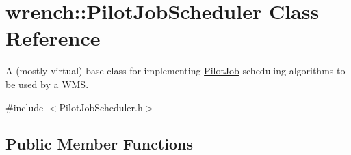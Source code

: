 \hypertarget{classwrench_1_1_pilot_job_scheduler}{}\section{wrench\+:\+:Pilot\+Job\+Scheduler Class Reference}
\label{classwrench_1_1_pilot_job_scheduler}


A (mostly virtual) base class for implementing \hyperlink{classwrench_1_1_pilot_job}{Pilot\+Job} scheduling algorithms to be used by a \hyperlink{classwrench_1_1_w_m_s}{W\+MS}.  




{\ttfamily \#include $<$Pilot\+Job\+Scheduler.\+h$>$}

\subsection*{Public Member Functions}
